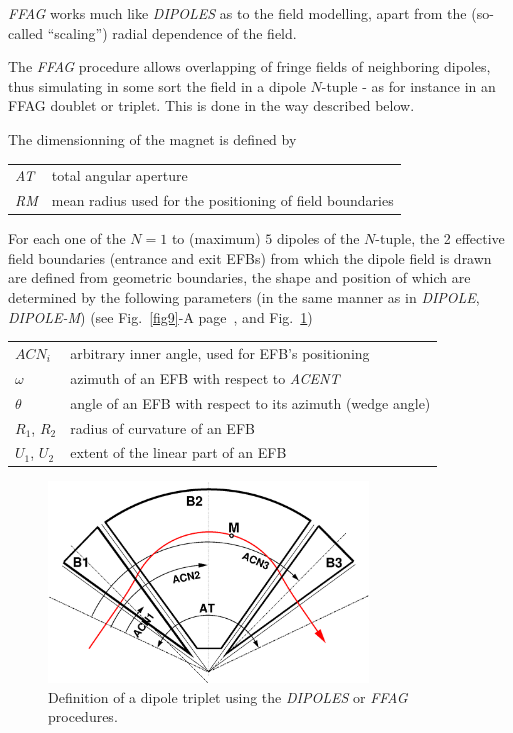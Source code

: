 \noindent \textsl{FFAG} works much like \textsl{DIPOLES} 
as to the field modelling, apart from the (so-called ``scaling'') radial dependence of the field. 

\bigskip

\noindent The \textsl{FFAG} procedure allows overlapping of fringe fields of neighboring dipoles, 
thus simulating in some sort the field in a dipole $N$-tuple - as for instance in an FFAG doublet 
or triplet. This is done in the way described below. 

\bigskip

\noindent  The dimensionning of the magnet is defined by

\bigskip

 \begin{tabular}{>{\sl}l!{:}l}
	 AT &  total angular aperture \\
	 RM & mean radius used for the positioning of field boundaries\\
 \end{tabular}

\bigskip

\noindent For each one of the $N=1$ to (maximum) $5$ dipoles of the  $N$-tuple, 
the 2  effective field boundaries (entrance and exit EFBs) from which  the dipole field  is drawn are
defined from geometric boundaries, the shape and position of which are determined by the 
following parameters (in the same manner as in \textsl{DIPOLE}, \textsl{DIPOLE-M})
 (see Fig.~\ref{fig9}-A page~\pageref{fig9}, and Fig.~\ref{figFFAG}) 

\bigskip

\begin{tabular}{l!{:}l}
	$ACN_i$  & arbitrary inner angle, used for EFB's positioning  \\
	$\omega$ &  azimuth of an EFB with respect to  \textsl{ACENT}\\
	$\theta$ & angle of an EFB with respect to its azimuth (wedge angle)\\ 
	$R_1$, $R_2$  &  radius of curvature of an EFB\\
	$U_1$, $U_2$  &  extent of the linear part of an EFB  \\
\end{tabular}

\begin{figure}[h]
 \begin{center}
\includegraphics[width=8.5cm]{ffagTriplet.eps}  
 \caption{ \label{figFFAG}
Definition of a dipole triplet using  the \textsl{DIPOLES} or  \textsl{FFAG}  procedures. 
}
  \end{center}
\end{figure}


